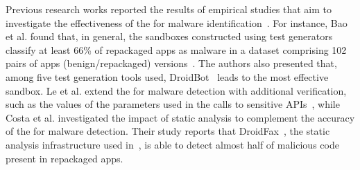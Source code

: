







Previous research works reported the results of empirical studies that aim to investigate the effectiveness of
the \mas for malware identification~\cite{DBLP:conf/wcre/BaoLL18,DBLP:conf/scam/CostaMCMVBC20}.
For instance, Bao et al. found that, in general, the sandboxes constructed using test generators classify at least 66\% of repackaged apps as malware in a dataset comprising 102 pairs of apps (benign/repackaged) versions~\cite{DBLP:conf/wcre/BaoLL18}.
The authors also presented that, among five test generation tools used, DroidBot~\cite{DBLP:conf/icse/LiYGC17} leads to the most effective sandbox.
Le et al. extend the \mas for malware detection with additional verification,
such as the values of the parameters used in the
calls to sensitive APIs~\cite{le2018towards}, while
Costa et al.\cite{DBLP:journals/jss/CostaMMSSBNR22} investigated the impact of static analysis to complement the accuracy of the \mas
for malware detection. Their study reports that DroidFax~\cite{DBLP:conf/icsm/CaiR17a}, the static analysis infrastructure used in~\cite{DBLP:conf/wcre/BaoLL18}, is able to detect almost half of malicious code present in repackaged apps.

